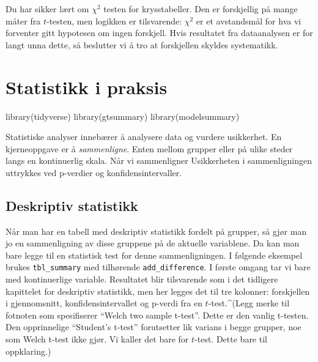 \documentclass[
  norsk,
  letterpaper,
  DIV=11,
  numbers=noendperiod]{scrreprt}
\newenvironment{Shaded}{\begin{snugshade}}{\end{snugshade}}
\newcommand{\FunctionTok}[1]{\textcolor[rgb]{0.28,0.35,0.67}{#1}}
\newcommand{\NormalTok}[1]{\textcolor[rgb]{0.00,0.23,0.31}{#1}}
\theoremstyle{definition}
\theoremstyle{remark}
\begin{document}
Du har sikker lært om \(\chi^2\) testen for krysstabeller. Den er
forskjellig på mange måter fra \(t\)-testen, men logikken er
tilsvarende: \(\chi^2\) er et avstandsmål for hva vi forventer gitt
hypotesen om ingen forskjell. Hvis resultatet fra dataanalysen er for
langt unna dette, så beslutter vi å tro at forskjellen skyldes
systematikk.

\chapter{Statistikk i praksis}\label{statistikk-i-praksis}

\begin{Shaded}
\begin{Highlighting}[]
\FunctionTok{library}\NormalTok{(tidyverse)}
\FunctionTok{library}\NormalTok{(gtsummary)}
\FunctionTok{library}\NormalTok{(modelsummary)}
\end{Highlighting}
\end{Shaded}

Statistiske analyser innebærer å analysere data og vurdere usikkerhet.
En kjerneoppgave er å \emph{sammenligne}. Enten mellom grupper eller på
ulike steder langs en kontinuerlig skala. Når vi sammenligner
Usikkerheten i sammenligningen uttrykkes ved p-verdier og
konfidensintervaller.

\section{Deskriptiv statistikk}\label{deskriptiv-statistikk}

Når man har en tabell med deskriptiv statistikk fordelt på grupper, så
gjør man jo en sammenligning av disse gruppene på de aktuelle
variablene. Da kan man bare legge til en statistisk test for denne
sammenligningen. I følgende eksempel brukes \texttt{tbl\_summary} med
tilhørende \texttt{add\_difference}. I første omgang tar vi bare med
kontinuerlige variable. Resultatet blir tilsvarende som i det tidligere
kapittelet for deskriptiv statistikk, men her legges det til tre
kolonner: forskjellen i gjennomsnitt, konfidensintervallet og p-verdi
fra en \(t\)-test.\^{}(Legg merke til fotnoten som spesifiserer ``Welch
two sample t-test''. Dette er den vanlig t-testen. Den opprinnelige
``Student's t-test'' forutsetter lik varians i begge grupper, noe som
Welch t-test ikke gjør. Vi kaller det bare for \(t\)-test. Dette bare
til oppklaring.)
\end{document}
